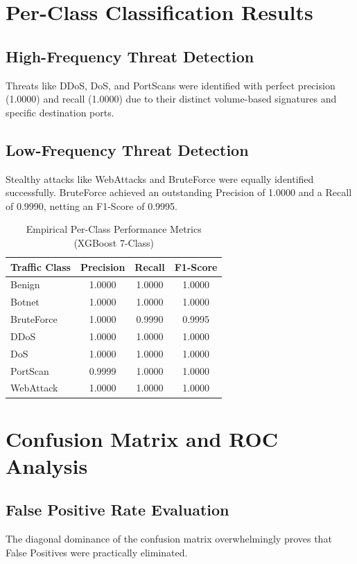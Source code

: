 \documentclass[12pt, a4paper]{report}
\begin{document}
\section{Per-Class Classification Results}
\subsection{High-Frequency Threat Detection}
Threats like DDoS, DoS, and PortScans were identified with perfect precision (1.0000) and recall (1.0000) due to their distinct volume-based signatures and specific destination ports.
\subsection{Low-Frequency Threat Detection}
Stealthy attacks like WebAttacks and BruteForce were equally identified successfully. BruteForce achieved an outstanding Precision of 1.0000 and a Recall of 0.9990, netting an F1-Score of 0.9995.

\begin{table}[htbp]
    \centering
    \caption{Empirical Per-Class Performance Metrics (XGBoost 7-Class)}
    \vspace{0.3cm}
    \begin{tabular}{|l|c|c|c|}
    \hline
    \textbf{Traffic Class} & \textbf{Precision} & \textbf{Recall} & \textbf{F1-Score} \\ \hline
    Benign & 1.0000 & 1.0000 & 1.0000 \\ \hline
    Botnet & 1.0000 & 1.0000 & 1.0000 \\ \hline
    BruteForce & 1.0000 & 0.9990 & 0.9995 \\ \hline
    DDoS & 1.0000 & 1.0000 & 1.0000 \\ \hline
    DoS & 1.0000 & 1.0000 & 1.0000 \\ \hline
    PortScan & 0.9999 & 1.0000 & 1.0000 \\ \hline
    WebAttack & 1.0000 & 1.0000 & 1.0000 \\ \hline
    \end{tabular}
    \label{tab:per_class}
\end{table}

\section{Confusion Matrix and ROC Analysis}
\subsection{False Positive Rate Evaluation}
The diagonal dominance of the confusion matrix overwhelmingly proves that False Positives were practically eliminated.
\end{document}
